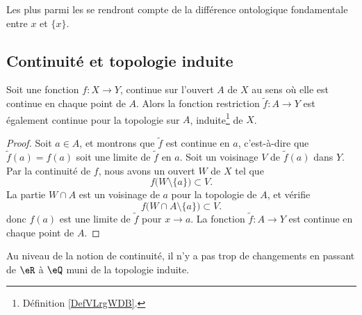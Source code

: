 Les plus  parmi les  se rendront compte de la différence ontologique fondamentale entre \( x\) et \( \{ x \}\).


\subsection{Continuité et topologie induite}
\begin{proposition}     \label{PROPooNPLBooPfmmym}
	Soit une fonction \( f\colon X\to Y\), continue sur l'ouvert \( A\) de \( X\) au sens où elle est continue en chaque point de \( A\). Alors la fonction restriction \( \tilde f\colon A\to Y\) est également continue pour la topologie sur \( A\), induite\footnote{Définition \ref{DefVLrgWDB}.} de \( X\).
\end{proposition}

\begin{proof}
	Soit \( a\in A\), et montrons que \( \tilde f\) est continue en \( a\), c'est-à-dire que \( \tilde f(a)=f(a)\) soit une limite de \( \tilde f\) en \( a\). Soit un voisinage \( V\) de \( \tilde f(a)\) dans \( Y\). Par la continuité de \( f\), nous avons un ouvert \( W\) de \( X\) tel que
	\begin{equation}
		f\big( W\setminus\{ a \} \big)\subset V.
	\end{equation}
	La partie \( W\cap A\) est un voisinage de \( a\) pour la topologie de \( A\), et vérifie
	\begin{equation}
		f\big( W\cap A\setminus\{ a \} \big)\subset V.
	\end{equation}
	donc \( f(a)\) est une limite de \( \tilde f\) pour \( x\to a\). La fonction \( \tilde f\colon A\to Y\) est continue en chaque point de \( A\).
\end{proof}

Au niveau de la notion de continuité, il n'y a pas trop de changements en passant de \( \eR\) à \( \eQ\) muni de la topologie induite.

